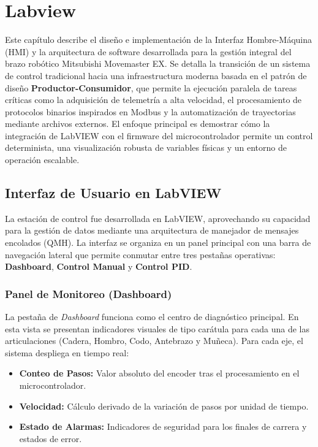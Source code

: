 \chapter{Labview}
\lineaLateral

\begin{resumenCapitulo}
Este capítulo describe el diseño e implementación de la Interfaz Hombre-Máquina (HMI) y la arquitectura de software desarrollada para la gestión integral del brazo robótico Mitsubishi Movemaster EX. Se detalla la transición de un sistema de control tradicional hacia una infraestructura moderna basada en el patrón de diseño \textbf{Productor-Consumidor}, que permite la ejecución paralela de tareas críticas como la adquisición de telemetría a alta velocidad, el procesamiento de protocolos binarios inspirados en Modbus y la automatización de trayectorias mediante archivos externos. 
El enfoque principal es demostrar cómo la integración de LabVIEW con el firmware del microcontrolador permite un control determinista, una visualización robusta de variables físicas y un entorno de operación escalable.
\end{resumenCapitulo}


\section{Interfaz de Usuario en LabVIEW}
La estación de control fue desarrollada en LabVIEW, aprovechando su capacidad para la gestión de datos mediante una arquitectura de manejador de mensajes encolados (QMH). La interfaz se organiza en un panel principal con una barra de navegación lateral que permite conmutar entre tres pestañas operativas: \textbf{Dashboard}, \textbf{Control Manual} y \textbf{Control PID}.

\subsection{Panel de Monitoreo (Dashboard)}
La pestaña de \textit{Dashboard} funciona como el centro de diagnóstico principal. En esta vista se presentan indicadores visuales de tipo carátula para cada una de las articulaciones (Cadera, Hombro, Codo, Antebrazo y Muñeca). Para cada eje, el sistema despliega en tiempo real:
\begin{itemize}
	\item \textbf{Conteo de Pasos:} Valor absoluto del encoder tras el procesamiento en el microcontrolador.
	\item \textbf{Velocidad:} Cálculo derivado de la variación de pasos por unidad de tiempo.
	\item \textbf{Estado de Alarmas:} Indicadores de seguridad para los finales de carrera y estados de error.
\end{itemize}

